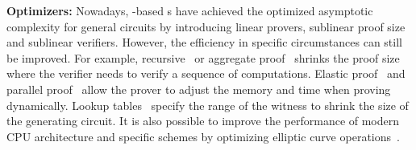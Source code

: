 \documentclass[letterpaper,twocolumn,10pt]{article}
\theoremstyle{definition}
\newcommand{\mypara}[1]{\noindent\textbf{{#1: }}}
\newcommand{\zk}{\text{zk-SNARK}\xspace}
\newcommand{\PCP}{\text{PCP}\xspace}
\newcommand{\IP}{\text{IP}\xspace}
\newcommand{\PIOP}{\text{PIOP}\xspace}
\newcommand{\PCS}{\text{PCS}\xspace}
\begin{document}

\mypara{Optimizers}Nowadays, -based {\zk}s have achieved the optimized asymptotic complexity for general circuits by introducing linear provers, sublinear proof size and sublinear verifiers. However, the efficiency in specific circumstances can still be improved. For example, recursive~\cite{halo2,plonky2,bunz2020recursive} or aggregate proof~\cite{bunz2018bulletproofs,chung2022bulletproofs+} shrinks the proof size where the verifier needs to verify a sequence of computations. Elastic proof~\cite{bootle2022gemini} and parallel proof~\cite{ephraim2020sparks} allow the prover to adjust the memory and time when proving dynamically. Lookup tables~\cite{campanelli2024lookup} specify the range of the witness to shrink the size of the generating circuit.
It is also possible to improve the performance of modern CPU architecture and specific schemes by optimizing elliptic curve operations~\cite{el2022families}.
\end{document}
